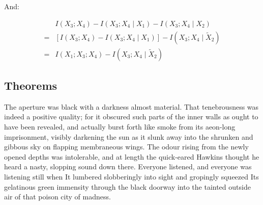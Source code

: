 And:

\begin{align}
  \label{eq:none}
  & I(X_3;X_4)-I(X_3;X_4\mid{}X_1)-I(X_3;X_4\mid{}X_2) \nonumber \\
  = & [I(X_3;X_4)-I(X_3;X_4\mid{}X_1)]-I(X_3;X_4\mid{}\tilde{X}_2) \\
  = & I(X_1;X_3;X_4)-I(X_3;X_4\mid{}\tilde{X}_2)
\end{align}

\subsection{Theorems}

The aperture was black with a darkness almost material. That tenebrousness was indeed a positive quality; for it obscured such parts of the inner walls as ought to have been revealed, and actually burst forth like smoke from its aeon-long imprisonment, visibly darkening the sun as it slunk away into the shrunken and gibbous sky on flapping membraneous wings. The odour rising from the newly opened depths was intolerable, and at length the quick-eared Hawkins thought he heard a nasty, slopping sound down there. Everyone listened, and everyone was listening still when It lumbered slobberingly into sight and gropingly squeezed Its gelatinous green immensity through the black doorway into the tainted outside air of that poison city of madness.

